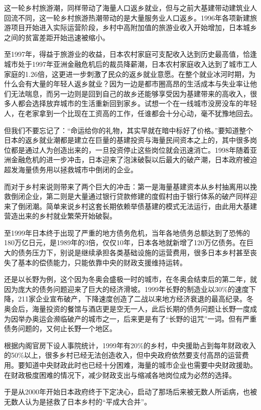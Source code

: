 这一轮乡村旅游潮，同样带动了海量人口返乡就业，但与之前大基建带动建筑业人回流不同，这一轮乡村旅游热潮带动的是大量服务业人口返乡。1996年各项新建旅游项目开始进入实际运营阶段，乡村中高附加值的旅游业收入开始增加，日本城乡之间的贫富差距开始迅速被缩小。

至1997年，得益于旅游业的收益，日本农村家庭可支配收入达到历史最高值，恰逢城市处于1997年亚洲金融危机后的裁员降薪潮，日本农村家庭收入达到了城市工人家庭的1.26倍，这更进一步刺激了民众的返乡就业意愿。在整个就业冰河时期，为什么会有大量的年轻人返乡就业？因为一边是都市圈高昂的生活成本与失业率让他们无法喘息，而另一边则是回到自己的故乡还能够享受因为基建带来的高收入，很多人都会选择放弃城市的生活重新回到家乡。试想一个在一线城市没房没车的年轻人，在老家拿到一个比现在工资高的工作，任谁都会十分心动，毫不犹豫地回去。

但我们不要忘记了：“命运给你的礼物，其实早就在暗中标好了价格。”要知道整个日本的返乡就业潮都是建立在巨量的基建投资与海量民间资本之上的，其中很多岗位都是通过人为创造出来的，一旦投资停止这些岗位就会迅速消亡。1998年随着亚洲金融危机的进一步冲击，日本迎来了泡沫破裂以后最大的破产潮，日本政府被迫超发海量债务用以拯救城市中倒闭的企业。

而对于乡村来说则带来了两个巨大的冲击：第一是海量基建资本从乡村抽离用以挽救倒闭企业，第二则是大量通过银行贷款修建的度假村由于银行体系的破产同样迎来了倒闭潮。简单来说乡村这套长期依赖举债基建的模式无法运行，由此用大基建营造出来的乡村就业繁荣开始破裂。

至1999年日本终于出现了严重的地方债务危机，当年各地债务总额达到了恐怖的180万亿日元，是1989年的3倍，仅仅10年，日本各地就新增了120万亿债务。在巨大的债务压力下，别说是继续承担各类基础设施的运营费用，很多日本乡村甚至丧失了基本的偿债能力，只能依靠中央的财政支援维持运转。

还是以长野为例，这个因为冬奥会盛极一时的城市，在冬奥会结束后的第二年，就因为庞大的债务问题迎来了巨大的经济滑坡。1999年长野的制造业以30\%的速度下降，211家企业宣布破产，下降速度创造了二战以来地方经济衰退的最高纪录。冬奥会后，海量投资的餐馆与酒店更是空无一人，此后长期的债务问题让长野一度成为因举办奥运会濒临破产的城市之一，后来更是有了“长野的诅咒”一词。但有严重债务问题的，又何止长野一个地区。

根据内阁官房下设人事院统计，1999年有20\%的乡村，中央援助占到每年财政收入的50\%以上，很多乡村已经无法创造收入，但中央政府依然要支付高昂的运营费用。要知道中央财政此时也已经十分困难，海量的城市企业也需要中央财政援助。在财政极度困难的情况下，减少财政支出与缩减各地岗位成为必然的选择。

于是从2000年开始日本政府终于下定决心，启动了那场后来被无数人所诟病，也被无数人认为是拯救了日本乡村的“平成大合并”。

